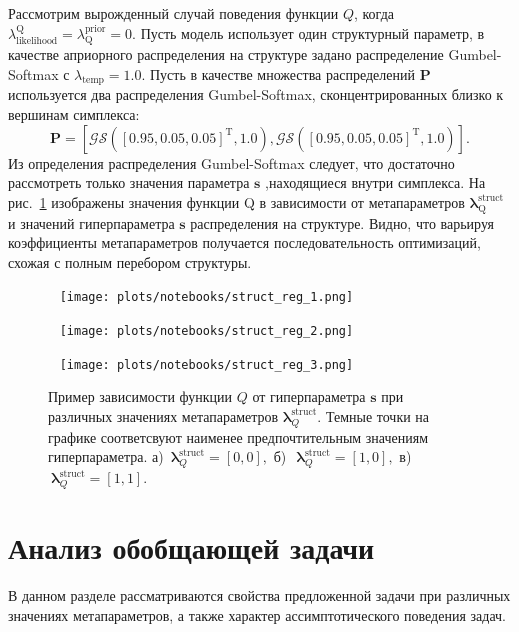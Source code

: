 \begin{example} 
Рассмотрим вырожденный случай поведения функции $Q$, когда $\lambda_\text{likelihood}^\text{Q} = \lambda^\text{prior}_\text{Q} = 0$. Пусть модель использует один структурный параметр, в качестве априорного распределения на структуре задано распределение Gumbel-Softmax с $\lambda_\text{temp}=1.0$. Пусть в качестве множества распределений $\mathbf{P}$ используется два распределения Gumbel-Softmax, сконцентрированных близко к вершинам симплекса:
\[
    \mathbf{P} = [\mathcal{GS}([0.95, 0.05, 0.05]^\text{T}, 1.0) ,\mathcal{GS}([0.95, 0.05, 0.05]^{\text{T}}, 1.0)].
\]
Из определения распределения Gumbel-Softmax следует, что достаточно рассмотреть только значения параметра $\mathbf{s}$ ,находящиеся внутри симплекса.
На рис.~\ref{fig:gs_comb} изображены значения функции Q в зависимости от метапараметров $\boldsymbol{\lambda}^\text{struct}_\text{Q}$ и значений гиперпараметра $\mathbf{s}$ распределения на структуре. Видно, что варьируя  коэффициенты метапараметров получается последовательность оптимизаций, схожая с полным перебором структуры.
\end{example}


\begin{figure}
 \begin{minipage}[t]{.32\textwidth}
   \texttt{[image: plots/notebooks/struct\_reg\_1.png]}
\subcaption{}
\end{minipage}
\hfill
 \begin{minipage}[t]{.32\textwidth}
   \texttt{[image: plots/notebooks/struct\_reg\_2.png]}
\subcaption{}
\end{minipage}
\hfill
 \begin{minipage}[t]{.32\textwidth}
   \texttt{[image: plots/notebooks/struct\_reg\_3.png]}
\subcaption{}
\end{minipage}

\caption{Пример зависимости функции $Q$ от гиперпараметра $\mathbf{s}$ при различных значениях метапараметров $\boldsymbol{\lambda}^\text{struct}_Q$. Темные точки на графике соответсвуют наименее предпочтительным значениям гиперпараметра. а)~$\boldsymbol{\lambda}^\text{struct}_Q = [0,0],$ б)~$~\boldsymbol{\lambda}^\text{struct}_Q = [1,0],$ в)~$~\boldsymbol{\lambda}^\text{struct}_Q = [1,1].$}
\label{fig:gs_comb}

\end{figure}

\section{Анализ обобщающей задачи}
В данном разделе рассматриваются свойства предложенной задачи при различных значениях метапараметров, а также характер ассимптотического поведения задач.


